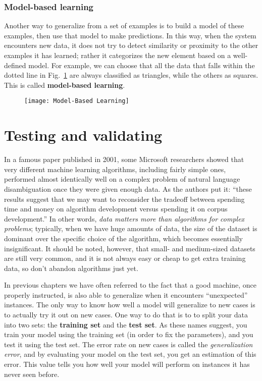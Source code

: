 \subsubsection{Model-based learning}
Another way to generalize from a set of examples is to build a model of these examples, then use that model to make predictions. In this way, when the system encounters new data, it does not try to detect similarity or proximity to the other examples it has learned; rather it categorizes the new element based on a well-defined model. For example, we can choose that all the data that falls within the dotted line in Fig.~\ref{Model-BasedLearning} are always classified as triangles, while the others as squares. This is called \textbf{model-based learning}.
\begin{figure}[h!t]
\centering
\texttt{[image: Model-Based Learning]}
\caption{}\label{Model-BasedLearning}
\end{figure}
\section{Testing and validating}\label{sec:Testing_and_validating}
In a famous paper published in 2001, some Microsoft researchers showed that very different machine learning algorithms, including fairly simple ones, performed almost identically well on a complex problem of natural language disambiguation once they were given enough data. As the authors put it: ``these results suggest that we may want to reconsider the tradeoff between spending time and money on algorithm development versus spending it on corpus development.'' In other words, \emph{data matters more than algorithms for complex problems}; typically, when we have huge amounts of data, the size of the dataset is dominant over the specific choice of the algorithm, which becomes essentially insignificant. It should be noted, however, that small- and medium-sized datasets are still very common, and it is not always easy or cheap to get extra training data, so don't abandon algorithms just yet.

In previous chapters we have often referred to the fact that a good machine, once properly instructed, is also able to generalize when it encounters ``unexpected'' instances. The only way to know how well a model will generalize to new cases is to actually try it out on new cases. One way to do that is to to split your data into two sets: the \textbf{training set} and the \textbf{test set}. As these names suggest, you train your model using the training set (in order to fix the parameters), and you test it using the test set. The error rate on new cases is called the \emph{generalization error}, and by evaluating your model on the test set, you get an estimation of this error. This value tells you how well your model will perform on instances it has never seen before.

